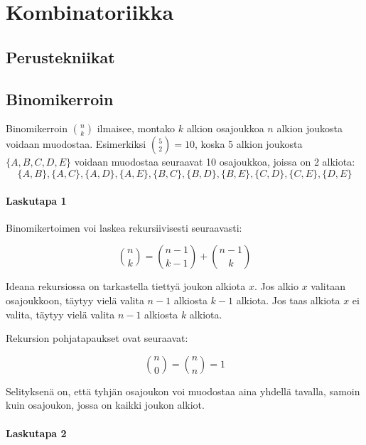 \chapter{Kombinatoriikka}
% 

\section{Perustekniikat}

\section{Binomikerroin}

Binomikerroin ${n \choose k}$ ilmaisee, montako
$k$ alkion osajoukkoa $n$ alkion joukosta
voidaan muodostaa.
Esimerkiksi ${5 \choose 2}=10$,
koska 5 alkion joukosta $\{A,B,C,D,E\}$
voidaan muodostaa seuraavat 10 osajoukkoa, joissa on 2 alkiota:
\[ \{A,B\}, \{A,C\}, \{A,D\}, \{A,E\}, \{B,C\}, 
\{B,D\}, \{B,E\}, \{C,D\}, \{C,E\}, \{D,E\} \]

\subsubsection{Laskutapa 1}

Binomikertoimen voi laskea rekursiivisesti seuraavasti:

\[
{n \choose k}  =  {n-1 \choose k-1} + {n-1 \choose k}
\]

Ideana rekursiossa on tarkastella tiettyä
joukon alkiota $x$.
Jos alkio $x$ valitaan osajoukkoon,
täytyy vielä valita $n-1$ alkiosta $k-1$ alkiota.
Jos taas alkiota $x$ ei valita,
täytyy vielä valita $n-1$ alkiosta $k$ alkiota.

Rekursion pohjatapaukset ovat seuraavat:

\[
{n \choose 0}  =  {n \choose n} = 1
\]

Selityksenä on, että tyhjän osajoukon voi muodostaa
aina yhdellä tavalla, samoin kuin osajoukon,
jossa on kaikki joukon alkiot.

\subsubsection{Laskutapa 2}


